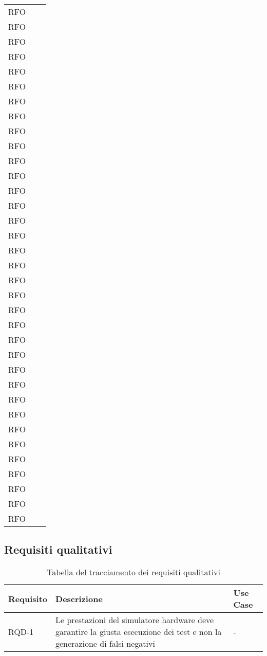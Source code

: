 \begin{table}
\begin{tabularx}{\textwidth}{lXl}
RFO &  & \\
RFO &  & \\
RFO &  & \\
RFO &  & \\
RFO &  & \\
RFO &  & \\
RFO &  & \\
RFO &  & \\
RFO &  & \\
RFO &  & \\
RFO &  & \\
RFO &  & \\
RFO &  & \\
RFO &  & \\
RFO &  & \\
RFO &  & \\
RFO &  & \\
RFO &  & \\
RFO &  & \\
RFO &  & \\
RFO &  & \\
RFO &  & \\
RFO &  & \\
RFO &  & \\
RFO &  & \\
RFO &  & \\
RFO &  & \\
RFO &  & \\
RFO &  & \\
RFO &  & \\
RFO &  & \\
RFO &  & \\
RFO &  & \\
RFO &  & \\
RFO &  & \\
\hline
\end{tabularx}
\end{table}%

\subsection{Requisiti qualitativi}

\begin{table}%
\caption{Tabella del tracciamento dei requisiti qualitativi}
\label{tab:requisiti-qualitativi}
\begin{tabularx}{\textwidth}{lXl}
\hline\hline
\textbf{Requisito} & \textbf{Descrizione} & \textbf{Use Case}\\
\hline
RQD-1    & Le prestazioni del simulatore hardware deve garantire la giusta esecuzione dei test e non la generazione di falsi negativi & - \\
\hline
\end{tabularx}
\end{table}%

